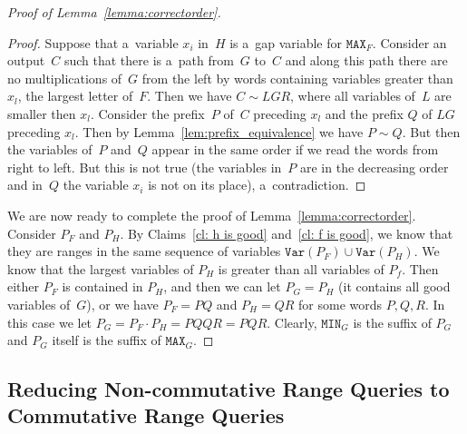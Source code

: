 \documentclass[11pt,letterpaper]{article}
\newcommand{\mmin}{\texttt{MIN}}
\newcommand{\mmax}{\texttt{MAX}}
\newcommand{\var}{\texttt{Var}}
\begin{document}
\begin{proof}[Proof of Lemma~\ref{lemma:correctorder}]
\begin{proof}
Suppose that a~variable $x_i$ in~$H$ is a~gap variable for $\mmax_F$. Consider an output~$C$ such that there is a~path from~$G$ to~$C$ and along this path there are no multiplications of~$G$ from the left by words containing variables greater than $x_l$, the largest letter of~$F$. Then we have $C \sim LGR$, where all variables of~$L$ are smaller then $x_l$. Consider the prefix~$P$ of~$C$ preceding $x_l$ and the prefix $Q$ of $LG$ preceding $x_l$.
Then by Lemma~\ref{lem:prefix_equivalence} we have $P \sim Q$. But then the variables of~$P$ and~$Q$ appear in the same order if we read the words from right to left. But this is not true (the variables in~$P$ are in the decreasing order and in~$Q$ the variable $x_i$ is not on its place), a~contradiction.
\end{proof}

We are now ready to complete the proof of Lemma~\ref{lemma:correctorder}.
Consider $P_F$ and $P_H$. By Claims~\ref{cl: h is good} and~\ref{cl: f is good}, we know that they are ranges in the same sequence of variables $\var(P_F)\cup \var(P_H)$. We know that the largest variables of $P_H$ is greater than all variables of $P_f$. Then either $P_F$ is contained in $P_H$, and then we can let $P_G=P_H$ (it contains all good variables of~$G$), or we have $P_F =PQ$ and $P_H=QR$ for some words $P, Q, R$. In this case we let $P_G = P_F \cdot P_H = PQQR=PQR$. Clearly, $\mmin_G$ is the suffix of $P_G$ and $P_G$ itself is the suffix of $\mmax_G$. 
\end{proof}



\subsection{Reducing Non-commutative Range Queries to Commutative Range Queries}
\end{document}
